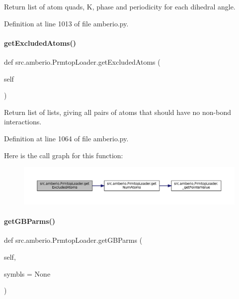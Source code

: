 Return list of atom quads, K, phase and periodicity for each dihedral angle. 



Definition at line 1013 of file amberio.\+py.

\mbox{\label{classsrc_1_1amberio_1_1PrmtopLoader_a386295fa291f134fe5d5358a139097b2}} 
\paragraph{\texorpdfstring{get\+Excluded\+Atoms()}{getExcludedAtoms()}}
{\footnotesize\ttfamily def src.\+amberio.\+Prmtop\+Loader.\+get\+Excluded\+Atoms (\begin{DoxyParamCaption}\item[{}]{self }\end{DoxyParamCaption})}



Return list of lists, giving all pairs of atoms that should have no non-\/bond interactions. 



Definition at line 1064 of file amberio.\+py.

Here is the call graph for this function\+:
\nopagebreak
\begin{figure}[H]
\begin{center}
\leavevmode
\includegraphics[width=350pt]{classsrc_1_1amberio_1_1PrmtopLoader_a386295fa291f134fe5d5358a139097b2_cgraph}
\end{center}
\end{figure}
\mbox{\label{classsrc_1_1amberio_1_1PrmtopLoader_a66a7271794489b104927997a25a5d6f8}} 
\paragraph{\texorpdfstring{get\+G\+B\+Parms()}{getGBParms()}}
{\footnotesize\ttfamily def src.\+amberio.\+Prmtop\+Loader.\+get\+G\+B\+Parms (\begin{DoxyParamCaption}\item[{}]{self,  }\item[{}]{symbls = {\ttfamily None} }\end{DoxyParamCaption})}



